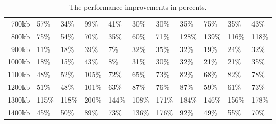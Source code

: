 \begin {table}[htpb]
\begin{tabular}{r|l|l|l|l|l|l|l|l|l|l}
700kb&57\%&34\%&99\%&41\%&30\%&30\%&35\%&75\%&35\%&43\%\\
800kb&75\%&54\%&70\%&35\%&60\%&71\%&128\%&139\%&116\%&118\%\\
900kb&11\%&18\%&39\%&7\%&32\%&35\%&32\%&19\%&24\%&32\%\\
1000kb&18\%&15\%&43\%&8\%&31\%&30\%&32\%&21\%&21\%&35\%\\
1100kb&48\%&52\%&105\%&72\%&65\%&73\%&82\%&68\%&82\%&78\%\\
1200kb&51\%&48\%&101\%&63\%&87\%&76\%&87\%&59\%&61\%&73\%\\
1300kb&115\%&118\%&200\%&144\%&108\%&171\%&184\%&146\%&156\%&178\%\\
1400kb&45\%&50\%&89\%&73\%&136\%&176\%&92\%&49\%&55\%&70\%\\
\end{tabular}
\caption{The performance improvements in percents.}
\label{tab:improvements-percent}
\end {table}
